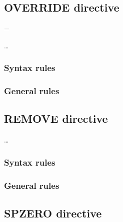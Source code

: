 \subsection{OVERRIDE directive}

\begin{syntax}[\miscextcolour]
  \begin{1=}
    \literal = \literal
  \end{1=} \dots
\end{syntax}

\subsubsection{Syntax rules}

\subsubsection{General rules}

\subsection{REMOVE directive}

\begin{syntax}[\miscextcolour]
   \literal \dots
\end{syntax}

\subsubsection{Syntax rules}

\subsubsection{General rules}

\subsection{SPZERO directive}

\begin{syntax}[\miscextcolour]
\end{syntax}

\begin{syntax}[\miscextcolour]
\end{syntax}

